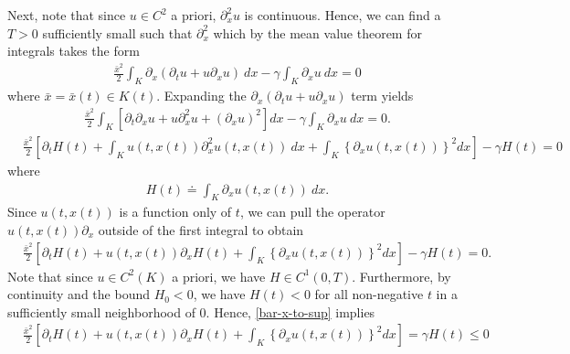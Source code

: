 \documentclass[12pt,reqno]{amsart}
\newcommand{\p}{\partial}
\theoremstyle{plain}  %
\begin{document}
Next, note that since $u \in C^2$ a priori, $\p_x^2 u$ is continuous. Hence, we can 
find a $T >0$ sufficiently small such that $ \p_x^2$ which by the mean value theorem for integrals takes the form
%
%
\begin{equation*}
	\begin{split}
		\frac{\bar{x}^2}{2} \int_K \p_x (\p_t u + u \p_x u) \ dx - \gamma 
		\int_K \p_x u \ dx = 0	
	\end{split}
\end{equation*}
%
%
where $\bar{x} = \bar{x}(t) \in K(t)$. Expanding the $\p_x (\p_t u + u \p_x 
u)$ term yields
%
%
\begin{equation*}
	\begin{split}
		\frac{\bar{x}^2}{2} \int_K \left[ \p_t \p_x u + u \p_x^2 u + (\p_x 
		u)^2 \right]  dx - \gamma \int_K \p_x u \ dx = 0.	
	\end{split}
\end{equation*}
%
%
\begin{equation*}
	\begin{split}
		& \frac{\bar{x}^2}{2} \left [ \p_t H(t) +  \int_K u(t,x(t)) 
		\p_x^2 u(t,x(t)) \ dx + \int_K \left \{\p_x u(t,x(t)) \right \}^2  dx 
		\right ]
		- \gamma H(t) = 0
	\end{split}
\end{equation*}
where
%
%
\begin{equation*}
	\label{H-def}
	\begin{split}
		H(t) \doteq \int_K \p_x u(t, x(t)) \ dx.
	\end{split}
\end{equation*}
%
%
Since $u(t, x(t))$ is a function only of $t$, we can pull the operator $u(t, x(t)) \p_x$ 
outside of the first integral to obtain
\begin{equation}
	\begin{split}
		\label{bar-x-to-sup}
		& \frac{\bar{x}^2}{2} \left [ \p_t H(t) + u(t, x(t)) \p_x H(t) +
		\int_K \left \{\p_x u(t,x(t)) \right \}^2  dx 
		\right ]
		- \gamma H(t) = 0.
	\end{split}
\end{equation}
Note that since $u \in C^2(K)$ a priori, we have $H \in C^1(0, T)$. 
Furthermore, by continuity and the bound $H_0 < 0$, we have 
$H(t) <0$ for all non-negative $t$ in a sufficiently small neighborhood of 
$0$. Hence, \eqref{bar-x-to-sup} implies
%
%
\begin{equation*}
	\begin{split}
		& \frac{\bar{x}^2}{2} \left [ \p_t H(t) + u(t, x(t)) \p_x H(t) +
		\int_K \left \{\p_x u(t,x(t)) \right \}^2  dx 
		\right ] = \gamma H(t) \le 0
	\end{split}
\end{equation*}
\end{document}
